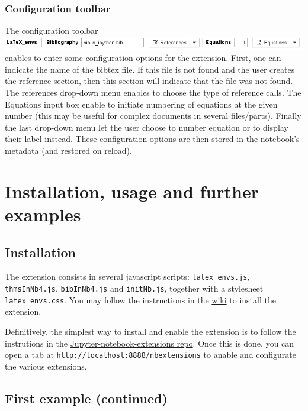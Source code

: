 \documentclass[11pt]{article}
\makeatletter
\def\maxwidth{\ifdim\Gin@nat@width>\linewidth\linewidth
    \else\Gin@nat@width\fi}
\let\Oldincludegraphics\includegraphics
\renewcommand{\includegraphics}[1]{\Oldincludegraphics[width=.8\maxwidth]{#1}}
\makeatother
\begin{document}
    \subsubsection{Configuration toolbar}\label{configuration-toolbar}

    The configuration toolbar \includegraphics{configuration_toolbar.png}
enables to enter some configuration options for the extension. First,
one can indicate the name of the bibtex file. If this file is not found
and the user creates the reference section, then this section will
indicate that the file was not found. The references drop-down menu
enables to choose the type of reference calls. The Equations input box
enable to initiate numbering of equations at the given number (this may
be useful for complex documents in several files/parts). Finally the
last drop-down menu let the user choose to number equation or to display
their label instead. These configuration options are then stored in the
notebook's metadata (and restored on reload).

    \section{Installation, usage and further
examples}\label{installation-usage-and-further-examples}

    \subsection{Installation}\label{installation}

    The extension consists in several javascript scripts:
\texttt{latex\_envs.js}, \texttt{thmsInNb4.js}, \texttt{bibInNb4.js} and
\texttt{initNb.js}, together with a stylesheet \texttt{latex\_envs.css}.
You may follow the instructions in the
\href{https://github.com/ipython-contrib/IPython-notebook-extensions/wiki}{wiki}
to install the extension.

Definitively, the simplest way to install and enable the extension is to
follow the instrutions in the
\href{https://github.com/ipython-contrib/Jupyter-notebook-extensions/blob/master/README.md}{Jupyter-notebook-extensions
repo}. Once this is done, you can open a tab at
\texttt{http://localhost:8888/nbextensions} to anable and configurate
the various extensions.

    \subsection{First example (continued)}\label{first-example-continued}
\end{document}
